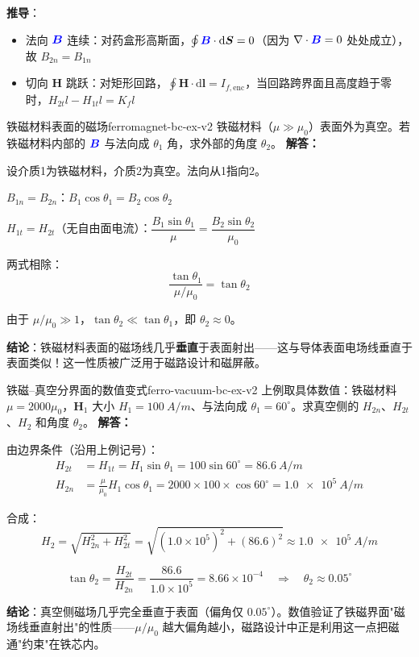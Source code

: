 \documentclass[11pt,a4paper,openany,oneside]{book}
\newcommand{\diff}{\mathrm{d}}
\newcommand{\vecB}{\textcolor{blue}{\vect{B}}}
\newcommand{\muz}{\mu_0}
\newcommand{\vect}[1]{\bm{#1}}
\newcommand{\divg}{\nabla\cdot}
\newcommand{\difficulty}[1]{\marginnote{\textcolor{red}{\textbf{[#1]}}}}
\begin{document}
\textbf{推导}：
\begin{itemize}
\item 法向 $\vecB$ 连续：对药盒形高斯面，$\oint\vecB\cdot\diff\vect{S} = 0$（因为 $\divg\vecB = 0$ 处处成立），故 $B_{2n} = B_{1n}$
\item 切向 $\vect{H}$ 跳跃：对矩形回路，$\oint\vect{H}\cdot\diff\vect{l} = I_{f,\text{enc}}$，当回路跨界面且高度趋于零时，$H_{2t}l - H_{1t}l = K_f l$
\end{itemize}

\begin{example}{铁磁材料表面的磁场}{ferromagnet-bc-ex-v2}
\difficulty{提高}
铁磁材料（$\mu \gg \muz$）表面外为真空。若铁磁材料内部的 $\vecB$ 与法向成 $\theta_1$ 角，求外部的角度 $\theta_2$。
\tcblower
\textbf{解答：}

设介质1为铁磁材料，介质2为真空。法向从1指向2。

$B_{1n} = B_{2n}$：$B_1\cos\theta_1 = B_2\cos\theta_2$

$H_{1t} = H_{2t}$（无自由面电流）：$\dfrac{B_1\sin\theta_1}{\mu} = \dfrac{B_2\sin\theta_2}{\muz}$

两式相除：
\[
\frac{\tan\theta_1}{\mu/\muz} = \tan\theta_2
\]

由于 $\mu/\muz \gg 1$，$\tan\theta_2 \ll \tan\theta_1$，即 $\theta_2 \approx 0$。

\textbf{结论}：铁磁材料表面的磁场线几乎\textbf{垂直}于表面射出——这与导体表面电场线垂直于表面类似！这一性质被广泛用于磁路设计和磁屏蔽。
\end{example}

\begin{example}{铁磁--真空分界面的数值变式}{ferro-vacuum-bc-ex-v2}
\difficulty{提高}
上例取具体数值：铁磁材料 $\mu = 2000\muz$，$\vect{H}_1$ 大小 $H_1 = \SI{100}{A/m}$、与法向成 $\theta_1 = 60^\circ$。求真空侧的 $H_{2n}$、$H_{2t}$、$H_2$ 和角度 $\theta_2$。
\tcblower
\textbf{解答：}

由边界条件（沿用上例记号）：
\begin{align*}
H_{2t} &= H_{1t} = H_1\sin\theta_1 = 100\sin 60^\circ = \SI{86.6}{A/m} \\
H_{2n} &= \frac{\mu}{\muz}H_1\cos\theta_1 = 2000 \times 100 \times \cos 60^\circ = \SI{1.0e5}{A/m}
\end{align*}

合成：
\[
H_2 = \sqrt{H_{2n}^2 + H_{2t}^2} = \sqrt{(1.0\times10^5)^2 + (86.6)^2} \approx \SI{1.0e5}{A/m}
\]

\[
\tan\theta_2 = \frac{H_{2t}}{H_{2n}} = \frac{86.6}{1.0\times10^5} = 8.66\times10^{-4} \quad\Rightarrow\quad \theta_2 \approx 0.05^\circ
\]

\textbf{结论}：真空侧磁场几乎完全垂直于表面（偏角仅 $0.05^\circ$）。数值验证了铁磁界面"磁场线垂直射出"的性质——$\mu/\muz$ 越大偏角越小，磁路设计中正是利用这一点把磁通"约束"在铁芯内。
\end{example}
\end{document}
